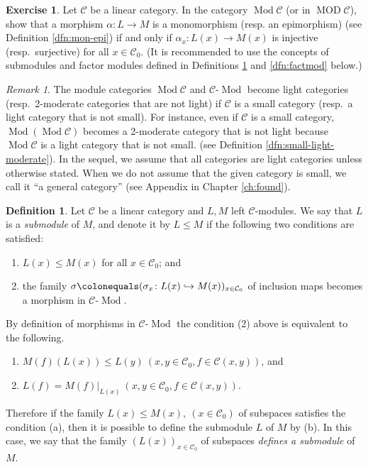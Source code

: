 \documentclass{surv-l}
\numberwithin{equation}{chapter}
\numberwithin{figure}{chapter}
\theoremstyle{plain}
\theoremstyle{definition}
\newtheorem{dfn}[thm]{Definition}
\newtheorem{exc}[thm]{Exercise}
\theoremstyle{remark}
\newtheorem{rmk}[thm]{Remark}
\DeclareMathOperator{\Mod}{Mod}
\DeclareMathOperator{\MOD}{MOD}
\begin{document}
\begin{exc}
Let ${\mathcal{C}}$ be a linear category.
In the category $\Mod {\mathcal{C}}$ (or in $\MOD {\mathcal{C}}$),
show that a morphism $\alpha \colon L \to M$ is a monomorphism (resp. an epimorphism)
(see Definition \ref{dfn:mon-epi}) if and only if
$\alpha_x \colon L(x) \to M(x)$ is injective (resp.\ surjective) for all
$x \in {\mathcal{C}}_0$.
(It is recommended to use the concepts of submodules and factor modules
defined in Definitions \ref{dfn:submod-cat} and \ref{dfn:factmod} below.)
\end{exc}

\begin{rmk}
The module categories $\Mod {\mathcal{C}}$ and ${\mathcal{C}}\text{-}\Mod$ become
light categories (resp.\ 2-moderate categories that are not light) if
${\mathcal{C}}$ is a small category (resp.\ a light category that is not small).
For instance, even if ${\mathcal{C}}$ is a small category,
$\Mod(\Mod {\mathcal{C}})$ becomes a 2-moderate category that is not light
because $\Mod {\mathcal{C}}$ is a light category that is not small.
(see Definition \ref{dfn:small-light-moderate}).
In the sequel, we assume that all categories are light categories
unless otherwise stated.
When we do not assume that the given category is small,
we call it ``a general category'' (see Appendix in Chapter \ref{ch:found}).
\end{rmk}

\begin{dfn}
\label{dfn:submod-cat}
Let ${\mathcal{C}}$ be a linear category and $L, M$ left ${\mathcal{C}}$-modules.
We say that $L$ is a \emph{submodule} of $M$, and denote it by
$L \le M$ if the following two conditions are satisfied:
\begin{enumerate}
\item
$L(x) \le M(x)$ for all $x \in {\mathcal{C}}_0$; and
\item
the family $\sigma\colonequals  (\sigma_x \colon L(x) \hookrightarrow M(x))_{x \in {\mathcal{C}}_0}$ of inclusion maps
becomes a morphism in ${\mathcal{C}}\text{-}\Mod $.
\end{enumerate}
By definition of morphisms in ${\mathcal{C}}\text{-}\Mod $
the condition (2) above is equivalent to the following.
\begin{enumerate}[label=(\alph*)]
\item
$M(f)(L(x)) \le L(y)\ (x, y \in {\mathcal{C}}_0, f \in {\mathcal{C}}(x, y))$,
and
\item
$L(f) = M(f)|_{L(x)}\ (x, y \in {\mathcal{C}}_0, f \in {\mathcal{C}}(x, y))$.
\end{enumerate}
Therefore if the family $L(x) \le M(x),\ (x \in {\mathcal{C}}_0)$ of subspaces
satisfies the condition (a), then it is possible to define the submodule $L$
of $M$ by (b).
In this case, we say that the family $(L(x))_{x \in {\mathcal{C}}_0}$ of subspaces
{\em defines a submodule} of $M$.
\end{dfn}
\end{document}
